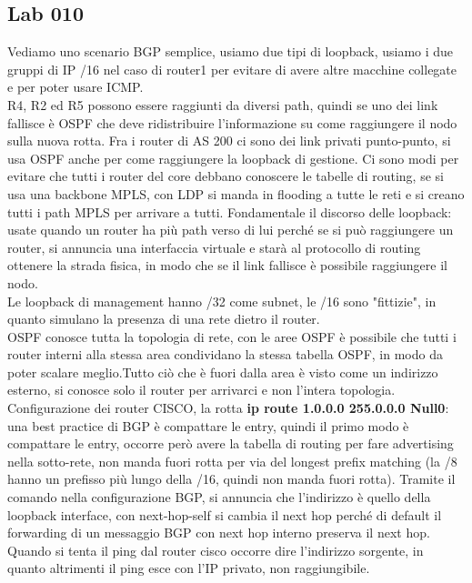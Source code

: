 \documentclass[12pt, oneside]{extbook} %
\begin{document}
\subsection*{Lab 010}
Vediamo uno scenario BGP semplice, usiamo due tipi di loopback, usiamo i due gruppi di IP /16 nel caso di router1 per evitare di avere altre macchine collegate e per poter usare ICMP.\\R4, R2 ed R5 possono essere raggiunti da diversi path, quindi se uno dei link fallisce è OSPF che deve ridistribuire l'informazione su come raggiungere il nodo sulla nuova rotta. Fra i router di AS 200 ci sono dei link privati punto-punto, si usa OSPF anche per come raggiungere la loopback di gestione. Ci sono modi per evitare che tutti i router del core debbano conoscere le tabelle di routing, se si usa una backbone MPLS, con LDP si manda in flooding a tutte le reti e si creano tutti i path MPLS per arrivare a tutti. Fondamentale il discorso delle loopback: usate quando un router ha più path verso di lui perché se si può raggiungere un router, si annuncia una interfaccia virtuale e starà al protocollo di routing ottenere la strada fisica, in modo che se il link fallisce è possibile raggiungere il nodo.\\Le loopback di management hanno /32 come subnet, le /16 sono "fittizie", in quanto simulano la presenza di una rete dietro il router.\\OSPF conosce tutta la topologia di rete, con le aree OSPF è possibile che tutti i router interni alla stessa area condividano la stessa tabella OSPF, in modo da poter scalare meglio.Tutto ciò che è fuori dalla area è visto come un indirizzo esterno, si conosce solo il router per arrivarci e non l'intera topologia.\\Configurazione dei router CISCO, la rotta \textbf{ip route 1.0.0.0 255.0.0.0 Null0}: una best practice di BGP è compattare le entry, quindi il primo modo è compattare le entry, occorre però avere la tabella di routing per fare advertising nella sotto-rete, non manda fuori rotta per via del longest prefix matching (la /8 hanno un prefisso più lungo della /16, quindi non manda fuori rotta). Tramite il comando nella configurazione BGP, si annuncia che l'indirizzo è quello della loopback interface, con next-hop-self si cambia il next hop perché di default il forwarding di un messaggio BGP con next hop interno preserva il next hop. Quando si tenta il ping dal router cisco occorre dire l'indirizzo sorgente, in quanto altrimenti il ping esce con l'IP privato, non raggiungibile.
\end{document}
